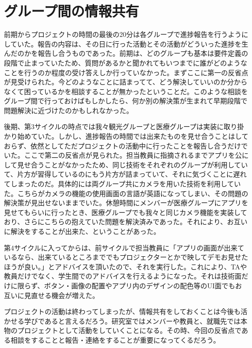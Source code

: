 \section{グループ間の情報共有}
前期からプロジェクトの時間の最後の20分は各グループで進捗報告を行うようにしていた。報告の内容は、その日に行った活動とその活動がどういった進捗を生んだのかを報告し合うものであった。前期は、どのグループも基本は要件定義の段階で止まっていたため、質問があるかと聞かれてもいつまでに誰がどのようなことを行うのか程度の受け答えしか行っていなかった。まずここに第一の反省点が見受けられた。今どのようなことに詰まってて、どう解決していいのか分からなくて困っているかを相談することが無かったということだ。このような相談をグループ間で行っておけばもしかしたら、何か別の解決策が生まれて早期段階で問題解決に近づけたのかもしれなかった。
\par 後期、第3サイクルの時点では我々観光グループと医療グループは実装に取り掛かり始めていた。しかし、進捗報告の時間では出来たものを見せ合うことはしておらず、依然としてただプロジェクトの活動中に行ったことを報告し合うだけでいた。ここで第二の反省点が見られた。担当教員に指摘されるまでアプリを公にして見せ合うことがなかったため、同じ技術をそれぞれのグループが利用していて、片方が習得しているのにもう片方が詰まっていて、それに気づくことに遅れてしまったのだ。具体的には両グループ共にカメラを用いた技術を利用していた。こちらがカメラの機能の使用画面の言語が英語になってしまい、その問題の解決策が見出せないままでいた。休憩時間にメンバーが医療グループにアプリを見せてもらいに行ったとき、医療グループでも我々と同じカメラ機能を実装しており、さらにこちらの抱えていた問題を解決済みであった。それにより、お互いに解決をすることが出来た、ということがあった。
\par 第4サイクルに入ってからは、前サイクルで担当教員に「アプリの画面が出来ているなら、出来ているところまででもプロジェクターとかで映してデモお見せたほうが良い。」とアドバイスを頂いたので、それを実行した。これにより、TAや教員だけでなく、学生間でのアドバイスを行えるようになった。それは技術面だけに限らず、ボタン・画像の配置やアプリ内のデザインの配色等のUI面でもお互いに見直せる機会が増えた。
\par プロジェクトの活動は終わってしまったが、情報共有をしておくことは今後も活かせる学びであると言えるだろう。研究室ではメンバーや教員と、就職先では本物のプロジェクトとして活動をしていくことになる。その時、今回の反省点である相談をすることと報告・連絡をすることが重要になってくるだろう。
